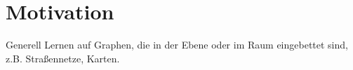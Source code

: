 \section{Motivation}

Generell Lernen auf Graphen, die in der Ebene oder im Raum eingebettet sind, z.B. Straßennetze, Karten.
